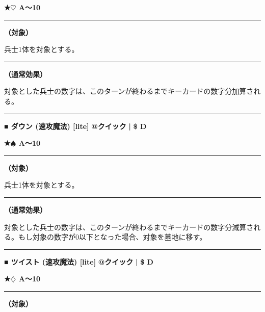 \documentclass[twocolumn,a5paper,papersize,10pt]{jarticle}
\begin{document}
{\footnotesize\bf ★{\normalsize $\heartsuit$} A〜10}

\vspace{1mm}%
\hrule height 0.1mm depth 0mm width 66.5mm %
\vspace{1mm}%
{\bf（対象）}

兵士1体を対象とする。
\vspace{1mm}%
\hrule height 0.1mm depth 0mm width 66.5mm %
\vspace{1mm}%

{\bf（通常効果）}

対象とした兵士の数字は、このターンが終わるまでキーカードの数字分加算される。
\vspace{2mm} %
\hrule height 0.5mm depth 0mm width 66.5mm %
\vspace{1mm} %
{\small\bf ■ ダウン {\scriptsize (速攻魔法) [lite]}} %
\hfill 
{\footnotesize\bf @クイック }
  {\footnotesize\bf | } {\footnotesize\bf \$ D}

{\footnotesize\bf ★{\normalsize $\spadesuit$} A〜10}

\vspace{1mm}%
\hrule height 0.1mm depth 0mm width 66.5mm %
\vspace{1mm}%
{\bf（対象）}

兵士1体を対象とする。
\vspace{1mm}%
\hrule height 0.1mm depth 0mm width 66.5mm %
\vspace{1mm}%

{\bf（通常効果）}

対象とした兵士の数字は、このターンが終わるまでキーカードの数字分減算される。もし対象の数字が0以下となった場合、対象を墓地に移す。
\vspace{2mm} %
\hrule height 0.5mm depth 0mm width 66.5mm %
\vspace{1mm} %
{\small\bf ■ ツイスト {\scriptsize (速攻魔法) [lite]}} %
\hfill 
{\footnotesize\bf @クイック }
  {\footnotesize\bf | } {\footnotesize\bf \$ D}

{\footnotesize\bf ★{\normalsize $\diamondsuit$} A〜10}

\vspace{1mm}%
\hrule height 0.1mm depth 0mm width 66.5mm %
\vspace{1mm}%
{\bf（対象）}
\end{document}
